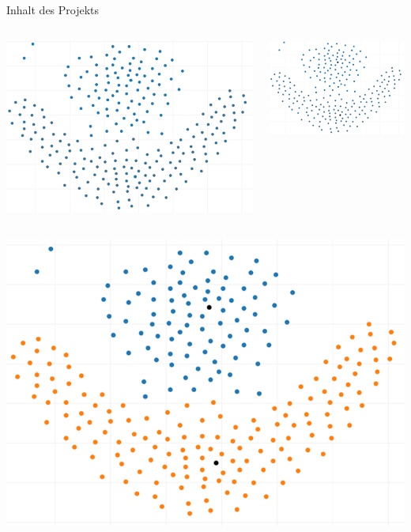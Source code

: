\documentclass[12pt, xcolor={usenames,dvipsnames,svgnames,x11names,table}]{beamer}
\begin{document}
	\begin{frame}{Inhalt des Projekts}{}
		\begin{columns}[c, onlytextwidth]
			\begin{column}{.5\textwidth}
				\center\includegraphics[scale=.25]{flame0}
			\end{column}
			\begin{column}{.5\textwidth}
				\center\includegraphics[scale=.25]{flame1}
			\end{column}
		\end{columns}
		
		\center\includegraphics[scale=.25]{flame2}
	\end{frame}
	
\end{document}
